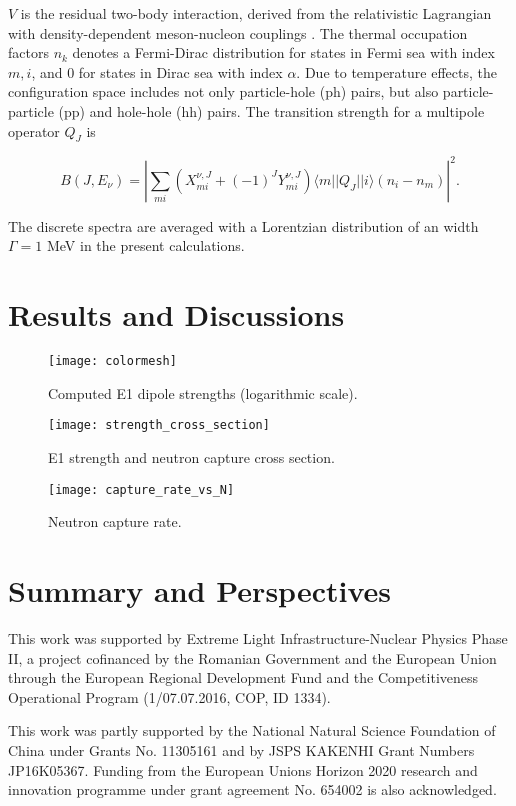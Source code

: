 \documentclass[prc,twocolumn,twoside,showpacs,superscriptaddress,floatfix]{revtex4-1}
\begin{document}
$V$ is the residual two-body interaction, derived from the relativistic
Lagrangian with  density-dependent meson-nucleon couplings \cite{Niksic}. The
thermal occupation factors $n_k$ denotes a Fermi-Dirac distribution for states
in Fermi sea with index $m,i$, and $0$ for states in Dirac sea with index
$\alpha$. Due to temperature effects, the configuration space includes not only
particle-hole (ph) pairs, but also particle-particle (pp) and hole-hole (hh)
pairs. The transition strength for a multipole operator $Q_J$ is

\begin{equation}
   B(J,E_\nu) = \left | \sum_{mi} (X^{\nu,J}_{mi} +
   (-1)^J Y^{\nu,J}_{mi} ) \langle m || Q_J || i\rangle (n_i
   -n_m) \right |^2.
\end{equation}

The discrete spectra are averaged with a Lorentzian distribution of an width
$\Gamma = 1 $ MeV in the present calculations.




\section{Results and Discussions}\label{results}

\begin{figure}[htp]
\centering
\texttt{[image: colormesh]}
\caption{\label{fig:e1}Computed E1 dipole strengths (logarithmic scale).}
\end{figure}

\begin{figure}[htp]
\centering
\texttt{[image: strength\_cross\_section]}
\caption{\label{fig:e1_xsec}E1 strength and neutron capture cross section.}
\end{figure}

\begin{figure}[htp]
\centering
\texttt{[image: capture\_rate\_vs\_N]}
\caption{\label{fig:neutron_capture}Neutron capture rate.}
\end{figure}

\section{Summary and Perspectives}\label{summary}

{}

This work was supported by Extreme Light Infrastructure-Nuclear
Physics Phase II, a project cofinanced by the Romanian Government
and the European Union through the European Regional Development
Fund and the Competitiveness Operational Program (1/07.07.2016,
COP, ID 1334).

This work was partly supported by the National Natural Science Foundation of China
under Grants No. 11305161 and by JSPS KAKENHI Grant Numbers JP16K05367.
Funding from the European Unions Horizon 2020 research and innovation
programme under grant agreement No. 654002 is also
acknowledged.

\clearpage

\end{document}
